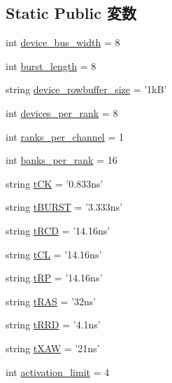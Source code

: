 \subsection*{Static Public 変数}
\begin{DoxyCompactItemize}
\item 
int \hyperlink{classDRAMCtrl_1_1DDR4__2400__x64_ac980afb64b962aec673eeadb21ea8b0e}{device\_\-bus\_\-width} = 8
\item 
int \hyperlink{classDRAMCtrl_1_1DDR4__2400__x64_afeba385888f1ce3063d25f20c0e7a89b}{burst\_\-length} = 8
\item 
string \hyperlink{classDRAMCtrl_1_1DDR4__2400__x64_ab24d9a52c5c94331e40478cc93e9abe1}{device\_\-rowbuffer\_\-size} = '1kB'
\item 
int \hyperlink{classDRAMCtrl_1_1DDR4__2400__x64_a60039c77757fd0118d81754311d71cfb}{devices\_\-per\_\-rank} = 8
\item 
int \hyperlink{classDRAMCtrl_1_1DDR4__2400__x64_ab610af52b1f27db17e9de304176a80a8}{ranks\_\-per\_\-channel} = 1
\item 
int \hyperlink{classDRAMCtrl_1_1DDR4__2400__x64_ac43360fda587200e99a090d69163e089}{banks\_\-per\_\-rank} = 16
\item 
string \hyperlink{classDRAMCtrl_1_1DDR4__2400__x64_a78016df5bd6c91551bcf487d3d665ebe}{tCK} = '0.833ns'
\item 
string \hyperlink{classDRAMCtrl_1_1DDR4__2400__x64_af962cc8ff13de9c28027368562b67c1e}{tBURST} = '3.333ns'
\item 
string \hyperlink{classDRAMCtrl_1_1DDR4__2400__x64_a31691ebf1f58ff89b00f261f5adea8e2}{tRCD} = '14.16ns'
\item 
string \hyperlink{classDRAMCtrl_1_1DDR4__2400__x64_a009c2614e5d317cb4805a4a98ace1b19}{tCL} = '14.16ns'
\item 
string \hyperlink{classDRAMCtrl_1_1DDR4__2400__x64_aeda425967c3cf2880bdc1640e9733439}{tRP} = '14.16ns'
\item 
string \hyperlink{classDRAMCtrl_1_1DDR4__2400__x64_a1b5f15dad9d492ce5d0167e1581de8cc}{tRAS} = '32ns'
\item 
string \hyperlink{classDRAMCtrl_1_1DDR4__2400__x64_ad1724b7d6484bbc6051f43d4ae9e16d2}{tRRD} = '4.1ns'
\item 
string \hyperlink{classDRAMCtrl_1_1DDR4__2400__x64_a94c112e585153e09e803751da3cfafcd}{tXAW} = '21ns'
\item 
int \hyperlink{classDRAMCtrl_1_1DDR4__2400__x64_a8b6fa0e85fb36be7e08d5c992065d7c2}{activation\_\-limit} = 4
\item 

\end{DoxyCompactItemize}
